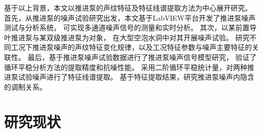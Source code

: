 \begin{comment}
传统的频谱分析方法已经无法准确的对流致激励特征声源进行识别，以及对推进泵的运行状态进行表征。
其噪声信号中存在复杂的干扰因素：其一，推进泵处在复杂的背景环境声场中，
动力系统等辅助结构产生的辐射噪声也给目标声源信号带来了很大干扰，影响
测试系统对推进泵目标真实辐射噪声信号的监测；其二，推进泵结构复杂，
推进泵辐射噪声场同时存在转子旋转声源，以及定子导管结构的静止声源，
其辐射噪声具有分量复杂性。基于上述因素，监测系统接收到的目标声场信号的信噪比较低。特征信
号如流致激励源特征频率、轴频等与其他背景噪声相比均较为微弱，
给基于传统噪声特征提取方法带来了困难，难以准确的识别噪声信号的流致激励源特征。
其次，推进泵噪声存在显著的调制特性，调制现象包含着丰富的流场信息，
但是传统的频谱分析及解调方法无法实现高精度低频调制特征的提取。
因此，开展低信噪比工况下的推进泵噪声信号的低频特征提取技术研究
有重要的理论和工程意义。
\end{comment}

基于以上背景，本文以推进泵的声纹特征及特征线谱提取方法为中心展开研究。
首先，从推进泵的噪声试验研究出发，本文基于LabVIEW平台开发了推进泵噪声测试与分析系统，
可实现多通道噪声信号的测量和实时分析。 
其次，以某前置导叶推进泵与某双级推进泵为对象，
在大型空泡水洞中对其开展噪声试验。
研究不同工况下推进泵噪声的声纹特征变化规律，以及工况特征参数与噪声主要特征的关联性。
最后，基于推进泵噪声试验数据进行了推进泵噪声信号模型研究，
验证了循环平稳分析方法的提取精度和抗噪性能。
采用二阶循环平稳统计量，对两种推进泵试验噪声进行了特征线谱提取。
基于特征提取结果，研究推进泵噪声内隐含的调制关系。

\begin{comment}

目前针对推进泵流致激励特性的研究已经开展了大量工作，研究主要集中通过数值模拟获取
压力脉动特性、激振力特性等方面，难以通过试验精确获取流致激励源特征。
其中蕴含着丰富的流致激励
源信息，但是传统的频谱分析及解调方法无法实现高精度低频调制特征的提取。

\end{comment}

\section{研究现状}
